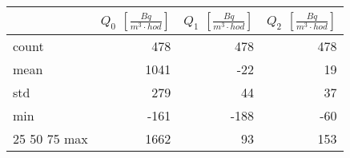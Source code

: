 \begin{tabular}{lrrr}
\toprule
{} &  $Q_0$ $\left[\si{\frac{Bq}{m^3\cdot hod}}\right]$ &  $Q_1$ $\left[\si{\frac{Bq}{m^3\cdot hod}}\right]$ &  $Q_2$ $\left[\si{\frac{Bq}{m^3\cdot hod}}\right]$ \\
\midrule
count &   478 &  478 & 478 \\
mean  &  1041 &  -22 &  19 \\
std   &   279 &   44 &  37 \\
min   &  -161 & -188 & -60 \\
25%
50%
75%
max   &  1662 &   93 & 153 \\
\bottomrule
\end{tabular}
